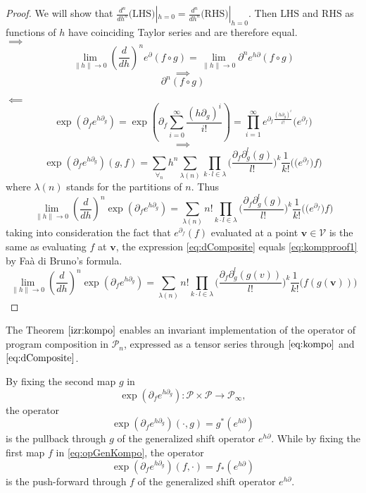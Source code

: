 \documentclass[11pt]{article}
\newcommand{\VV}{\mathcal{V}}
\newcommand{\vv}{\mathbf{v}}
\newcommand{\dP}{\mathcal{P}}
\newcommand{\D}{\partial}
\begin{document}
\begin{proof}
  We will show that $\frac{d^n}{dh^n}\text{(LHS)}|_{h=0}=\frac{d^n}{dh^n}\text{(RHS)}|_{h=0}$. Then $\text{LHS}$ and $\text{RHS}$ as functions
  of $h$ have coinciding Taylor series and are therefore equal.\\
 $\implies$
 $$\lim\limits_{\lVert h\rVert\to 0}(\frac{d}{dh})^ne^\D(f\circ g)=\lim\limits_{\lVert h\rVert\to 0}\D^ne^{h\D}(f\circ g)$$
 $$\implies$$
 \begin{equation}\label{eq:kompproof1}
 \D^n(f\circ g)
 \end{equation}
 
 $\impliedby$
 $$\exp(\D_fe^{h\D_g})=\exp\left(\D_f\sum\limits_{i=0}^{\infty}\frac{(h\D_g)^i}{i!}\right)=\prod_{i=1}^{\infty}e^{\D_f\frac{(h\D_g)^i}{i!}}\Big(e^{\D_f}\Big)$$
 $$\implies$$
 $$\exp(\D_fe^{h\D_g})(g,f)=\sum\limits_{\forall_n}h^n\sum\limits_{\lambda(n)}\prod\limits_{k\cdot l\in\lambda}\Big(\frac{\D_f\D_g^l(g)}{l!}\Big)^k\frac{1}{k!}\Big(\Big(e^{\D_f}\Big)f\Big)$$
 where $\lambda(n)$ stands for the partitions of $n$. Thus
 \begin{equation}\label{eq:dComposite}
 \lim\limits_{\lVert h\rVert\to 0}(\frac{d}{dh})^n\exp(\D_fe^{h\D_g})=\sum\limits_{\lambda(n)}n!\prod\limits_{k\cdot l\in\lambda}\Big(\frac{\D_f\D_g^l(g)}{l!}\Big)^k\frac{1}{k!}\Big(\Big(e^{\D_f}\Big)f\Big)
 \end{equation}
 taking into consideration the fact that $e^{\D_f}(f)$ evaluated at a point $\vv\in \VV$ is the same as evaluating $f$ at $\vv$, the expression \eqref{eq:dComposite} equals \eqref{eq:kompproof1} by Faà di Bruno's formula.
   \begin{equation}\label{eq:dCompositePoint}
   \lim\limits_{\lVert h\rVert\to 0}(\frac{d}{dh})^n\exp(\D_fe^{h\D_g})=\sum\limits_{\lambda(n)}n!\prod\limits_{k\cdot l\in\lambda}\Big(\frac{\D_f\D_g^l(g(v))}{l!}\Big)^k\frac{1}{k!}\Big(f(g(\vv))\Big)
   \end{equation}
 \end{proof}       
 The Theorem $\ref{izr:kompo}$ enables an invariant implementation of the operator of program composition in $\dP_n$, expressed as a tensor series through $\eqref{eq:kompo}$ and $\eqref{eq:dComposite}$. 
 
  By fixing the second map $g$ in  
  \begin{equation}\label{eq:opGenKompo}
 \exp(\D_fe^{h\D_g}): \dP\times\dP\to\dP_\infty,
  \end{equation}
  the operator
  \begin{equation}
   \exp(\D_fe^{h\D_g})(\cdot,g)=g^*\left( e^{h\D} \right)\label{eq:opKompo}
 \end{equation}
  is the pullback through $g$ of the generalized shift
  operator $e^{h\D}$. While by
  fixing the first map $f$ in \eqref{eq:opGenKompo}, the operator
  \begin{equation}
 \exp(\D_fe^{h\D_g})(f,\cdot)=f_*\left( e^{h\D} \right)\label{eq:opKompoForward}
 \end{equation} is the
  push-forward through $f$ of the generalized shift
  operator $e^{h\D}$.
 
\end{document}
